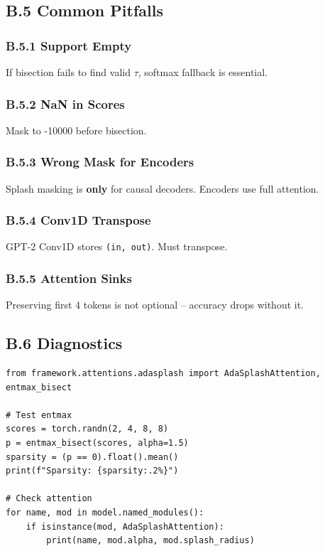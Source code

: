 \subsection{B.5 Common Pitfalls}

\subsubsection{B.5.1 Support Empty}

If bisection fails to find valid $\tau$, softmax fallback is essential.

\subsubsection{B.5.2 NaN in Scores}

Mask to -10000 before bisection.

\subsubsection{B.5.3 Wrong Mask for Encoders}

Splash masking is \textbf{only} for causal decoders. Encoders use full attention.

\subsubsection{B.5.4 Conv1D Transpose}

GPT-2 Conv1D stores \texttt{(in, out)}. Must transpose.

\subsubsection{B.5.5 Attention Sinks}

Preserving first 4 tokens is not optional -- accuracy drops without it.

\subsection{B.6 Diagnostics}

\begin{lstlisting}
from framework.attentions.adasplash import AdaSplashAttention, entmax_bisect

# Test entmax
scores = torch.randn(2, 4, 8, 8)
p = entmax_bisect(scores, alpha=1.5)
sparsity = (p == 0).float().mean()
print(f"Sparsity: {sparsity:.2%}")

# Check attention
for name, mod in model.named_modules():
    if isinstance(mod, AdaSplashAttention):
        print(name, mod.alpha, mod.splash_radius)
\end{lstlisting}


